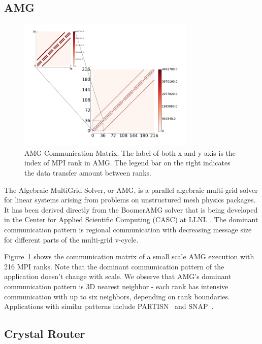 \subsection{AMG}
\label{sec:amg}

\begin{figure}[htp]
    \centering
    \includegraphics[height=2.5in]{figs/appstudy/amg/amg_pip}
    \caption{AMG Communication Matrix. 
        The label of both x and y axis is the index of MPI rank in AMG. 
        The legend bar on the right indicates the data transfer 
        amount between ranks.
        }
    \label{fig:amg-communication-topology}
\end{figure}

The Algebraic MultiGrid Solver, or AMG, 
is a parallel algebraic multi-grid solver for linear systems arising 
from problems on unstructured mesh physics packages. 
It has been derived directly from the BoomerAMG solver 
that is being developed in the Center for Applied Scientific Computing (CASC) at LLNL \cite{amg}. 
The dominant communication pattern is regional communication 
with decreasing message size for different parts of the multi-grid v-cycle.

Figure~\ref{fig:amg-communication-topology} shows the communication matrix 
of a small scale AMG execution with 216 MPI ranks. 
Note that the dominant communication pattern of the application doesn't change with scale. 
We observe that AMG's dominant communication pattern is 3D nearest neighbor - 
each rank has intensive communication with up to six neighbors, depending on rank boundaries. 
Applications with similar patterns include PARTISN~\cite{partisn} and SNAP~\cite{snap}.


\subsection{Crystal Router}
\label{sec:crystalrouter}


